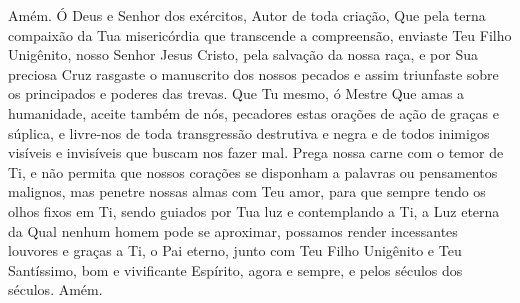 \documentclass{subfiles}
\begin{document}
\reader{}Amém. Ó Deus e Senhor dos exércitos, Autor de toda criação, Que pela
terna compaixão da Tua misericórdia que transcende a compreensão, enviaste Teu
Filho Unigênito, nosso Senhor Jesus Cristo, pela salvação da nossa raça, e por
Sua preciosa Cruz rasgaste o manuscrito dos nossos pecados e assim triunfaste
sobre os principados e poderes das trevas. Que Tu mesmo, ó Mestre Que amas a
humanidade, aceite também de nós, pecadores estas orações de ação de graças e
súplica, e livre-nos de toda transgressão destrutiva e negra e de todos inimigos
visíveis e invisíveis que buscam nos fazer mal. Prega nossa carne com o temor de
Ti, e não permita que nossos corações se disponham a palavras ou pensamentos
malignos, mas penetre nossas almas com Teu amor, para que sempre tendo os olhos
fixos em Ti, sendo guiados por Tua luz e contemplando a Ti, a Luz eterna da Qual
nenhum homem pode se aproximar, possamos render incessantes louvores e graças a
Ti, o Pai eterno, junto com Teu Filho Unigênito e Teu Santíssimo, bom e
vivificante Espírito, agora e sempre, e pelos séculos dos séculos. Amém.
\end{document}
